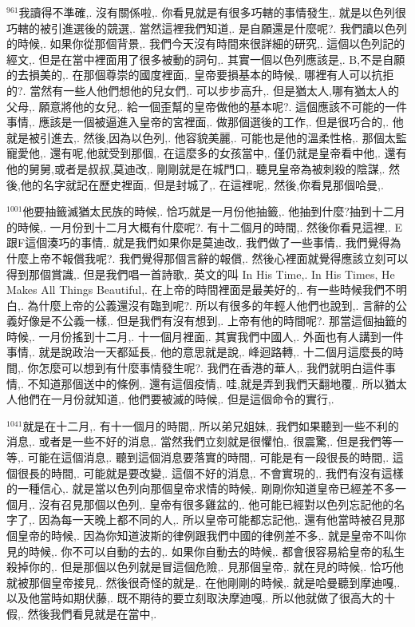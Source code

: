 \documentclass{book}
\begin{document}
$^{961}$我讀得不準確,.
沒有關係啦,.
你看見就是有很多巧轄的事情發生,.
就是以色列很巧轄的被引進選後的競選,.
當然這裡我們知道,.
是自願還是什麼呢?.
我們讀以色列的時候,.
如果你從那個背景,.
我們今天沒有時間來很詳細的研究,.
這個以色列記的經文,.
但是在當中裡面用了很多被動的詞句,.
其實一個以色列應該是,.
B,不是自願的去損美的,.
在那個尊崇的國度裡面,.
皇帝要損基本的時候,.
哪裡有人可以抗拒的?.
當然有一些人他們想他的兒女們,.
可以步步高升,.
但是猶太人,哪有猶太人的父母,.
願意將他的女兒,.
給一個歪幫的皇帝做他的基本呢?.
這個應該不可能的一件事情,.
應該是一個被逼進入皇帝的宮裡面,.
做那個選後的工作,.
但是很巧合的,.
他就是被引進去,.
然後,因為以色列,.
他容貌美麗,.
可能也是他的溫柔性格,.
那個太監寵愛他,.
還有呢,他就受到那個,.
在這麼多的女孩當中,.
僅仍就是皇帝看中他,.
還有他的舅舅,或者是叔叔,莫迪改,.
剛剛就是在城門口,.
聽見皇帝為被刺殺的陰謀,.
然後,他的名字就記在歷史裡面,.
但是封城了,.
在這裡呢,.
然後,你看見那個哈曼,.

$^{1001}$他要抽籤滅猶太民族的時候,.
恰巧就是一月份他抽籤,.
他抽到什麼?抽到十二月的時候,.
一月份到十二月大概有什麼呢?.
有十二個月的時間,.
然後你看見這裡,.
E跟F這個湊巧的事情,.
就是我們如果你是莫迪改,.
我們做了一些事情,.
我們覺得為什麼上帝不報償我呢?.
我們覺得那個言辭的報償,.
然後心裡面就覺得應該立刻可以得到那個賞識,.
但是我們唱一首詩歌,.
英文的叫 In His Time,.
In His Times, He Makes All Things Beautiful,.
在上帝的時間裡面是最美好的,.
有一些時候我們不明白,.
為什麼上帝的公義還沒有臨到呢?.
所以有很多的年輕人他們也說到,.
言辭的公義好像是不公義一樣,.
但是我們有沒有想到,.
上帝有他的時間呢?.
那當這個抽籤的時候,.
一月份搖到十二月,.
十一個月裡面,.
其實我們中國人,.
外面也有人講到一件事情,.
就是說政治一天都延長,.
他的意思就是說,.
峰迴路轉,.
十二個月這麼長的時間,.
你怎麼可以想到有什麼事情發生呢?.
我們在香港的華人,.
我們就明白這件事情,.
不知道那個送中的條例,.
還有這個疫情,.
哇,就是弄到我們天翻地覆,.
所以猶太人他們在一月份就知道,.
他們要被滅的時候,.
但是這個命令的實行,.

$^{1041}$就是在十二月,.
有十一個月的時間,.
所以弟兄姐妹,.
我們如果聽到一些不利的消息,.
或者是一些不好的消息,.
當然我們立刻就是很懼怕,.
很震驚,.
但是我們等一等,.
可能在這個消息,.
聽到這個消息要落實的時間,.
可能是有一段很長的時間,.
這個很長的時間,.
可能就是要改變,.
這個不好的消息,.
不會實現的,.
我們有沒有這樣的一種信心,.
就是當以色列向那個皇帝求情的時候,.
剛剛你知道皇帝已經差不多一個月,.
沒有召見那個以色列,.
皇帝有很多雞盆的,.
他可能已經對以色列忘記他的名字了,.
因為每一天晚上都不同的人,.
所以皇帝可能都忘記他,.
還有他當時被召見那個皇帝的時候,.
因為你知道波斯的律例跟我們中國的律例差不多,.
就是皇帝不叫你見的時候,.
你不可以自動的去的,.
如果你自動去的時候,.
都會很容易給皇帝的私生殺掉你的,.
但是那個以色列就是冒這個危險,.
見那個皇帝,.
就在見的時候,.
恰巧他就被那個皇帝接見,.
然後很奇怪的就是,.
在他剛剛的時候,.
就是哈曼聽到摩迪嘎,.
以及他當時如期伏藤,.
既不期待的要立刻取決摩迪嘎,.
所以他就做了很高大的十假,.
然後我們看見就是在當中,.
\end{document}
